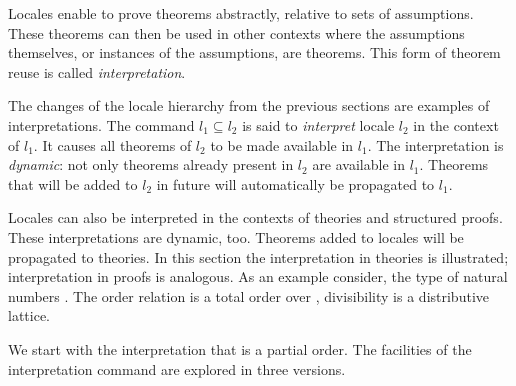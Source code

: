 %
\begin{isabellebody}%
\def\isabellecontext{Examples{\isadigit{1}}}%
%
\isadelimtheory
%
\endisadelimtheory
%
\isatagtheory
%
\endisatagtheory
{\isafoldtheory}%
%
\isadelimtheory
%
\endisadelimtheory
%
\isamarkuptrue%
%
\begin{isamarkuptext}%
Locales enable to prove theorems abstractly, relative to
  sets of assumptions.  These theorems can then be used in other
  contexts where the assumptions themselves, or
  instances of the assumptions, are theorems.  This form of theorem
  reuse is called \emph{interpretation}.

  The changes of the locale
  hierarchy from the previous sections are examples of
  interpretations.  The command  $l_1
  \subseteq l_2$ is said to \emph{interpret} locale $l_2$ in the
  context of $l_1$.  It causes all theorems of $l_2$ to be made
  available in $l_1$.  The interpretation is \emph{dynamic}: not only
  theorems already present in $l_2$ are available in $l_1$.  Theorems
  that will be added to $l_2$ in future will automatically be
  propagated to $l_1$.

  Locales can also be interpreted in the contexts of theories and
  structured proofs.  These interpretations are dynamic, too.
  Theorems added to locales will be propagated to theories.
  In this section the interpretation in
  theories is illustrated; interpretation in proofs is analogous.
  As an example consider, the type of natural numbers .  The
  order relation \isa{{\isasymle}} is a total order over ,
  divisibility  is a distributive lattice.

  We start with the
  interpretation that \isa{{\isasymle}} is a partial order.  The facilities of
  the interpretation command are explored in three versions.%
\end{isamarkuptext}%
\isamarkuptrue%
%
\isamarkuptrue%
%
\begin{isamarkuptext}%
\label{sec:po-first}


\end{isamarkuptext}
\end{isabellebody}

